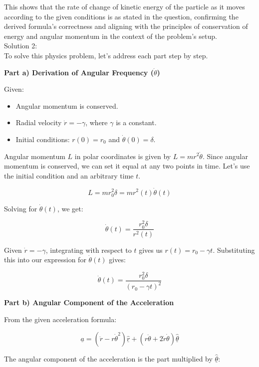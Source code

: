 \documentclass[a4paper,11pt]{article}
\begin{document}
This shows that the rate of change of kinetic energy of the particle as it moves according to the given conditions is as stated in the question, confirming the derived formula's correctness and aligning with the principles of conservation of energy and angular momentum in the context of the problem's setup. \\

\noindent Solution 2: \\

To solve this physics problem, let's address each part step by step.

\textbf{Part a) Derivation of Angular Frequency (\( \dot{\theta} \))}

Given:
\begin{itemize}
    \item Angular momentum is conserved.
    \item Radial velocity \( \dot{r} = - \gamma \), where \( \gamma \) is a constant.
    \item Initial conditions: \( r(0) = r_{0} \) and \( \dot{\theta}(0) = \delta \).
\end{itemize}

Angular momentum \( L \) in polar coordinates is given by \( L = m r^{2} \dot{\theta} \). Since angular momentum is conserved, we can set it equal at any two points in time. Let's use the initial condition and an arbitrary time \( t \).

\[ L = m r_{0}^{2} \delta = m r^{2}(t) \dot{\theta}(t) \]

Solving for \( \dot{\theta}(t) \), we get:

\[ \dot{\theta}(t) = \frac{r_{0}^{2} \delta}{r^{2}(t)} \]

Given \( \dot{r} = -\gamma \), integrating with respect to \( t \) gives us \( r(t) = r_{0} - \gamma t \). Substituting this into our expression for \( \dot{\theta}(t) \) gives:

\[ \dot{\theta}(t) = \frac{r_{0}^{2} \delta}{(r_{0} - \gamma t)^{2}} \]

\textbf{Part b) Angular Component of the Acceleration}

From the given acceleration formula:

\[ \underline{a} = (\ddot{r} - r \dot{\theta}^{2}) \underline{\hat{r}} + (r \ddot{\theta} + 2\dot{r}\dot{\theta} ) \underline{\hat{\theta}} \]

The angular component of the acceleration is the part multiplied by \( \underline{\hat{\theta}} \):
\end{document}
